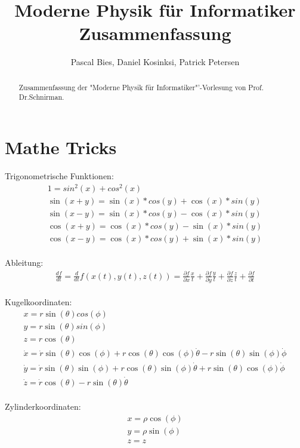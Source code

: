\documentclass[10pt,a4paper]{article}
\author{Pascal Bies, Daniel Kosinksi, Patrick Petersen}
\title{Moderne Physik für Informatiker Zusammenfassung}
\begin{document}
\maketitle

\begin{abstract}
Zusammenfassung der "Moderne Physik für Informatiker"'-Vorlesung von Prof. Dr.Schnirman.
\end{abstract}

\setcounter{tocdepth}{3}


\newpage
\tableofcontents


\newpage

\section{Mathe Tricks}

Trigonometrische Funktionen:
\begin{eqnarray}
1=sin^2(x)+cos^2(x)\\
\sin(x+y) = \sin(x)*cos(y) + \cos(x)*sin(y)\\
\sin(x-y) = \sin(x)*cos(y) - \cos(x)*sin(y)\\
\cos(x+y) = \cos(x)*cos(y) - \sin(x)*sin(y)\\
\cos(x-y) = \cos(x)*cos(y) + \sin(x)*sin(y)
\end{eqnarray}
%
\\
Ableitung:
\begin{eqnarray}
\frac{df}{dt} = \frac{d}{dt} f(x(t),y(t),z(t))=  \frac{\partial f}{\partial x} \frac{x}{t} + \frac{\partial f}{\partial y} \frac{y}{t} + \frac{\partial f}{\partial z} \frac{z}{t} + \frac{\partial f}{\partial t}
\end{eqnarray}
%
\\
Kugelkoordinaten:
\begin{eqnarray}
x = r \sin(\theta)cos(\phi)\\
y = r \sin(\theta)sin(\phi)\\
z = r \cos(\theta)\\
\dot{x} =\dot{r}\sin(\theta)\cos(\phi)+r\cos(\theta)\cos(\phi)\dot{\theta }-r\sin(\theta)\sin(\phi)\dot{\phi}\\
\dot{y} = \dot{r}\sin(\theta)\sin(\phi)+r\cos(\theta)\sin(\phi)\dot{\theta }+r\sin(\theta)\cos(\phi)\dot{\phi}\\
\dot{z}= \dot{r}\cos(\theta)-r\sin(\theta)\dot{\theta}
\end{eqnarray}
%
\\
Zylinderkoordinaten:
\begin{eqnarray}
x = \rho \cos(\phi)\\
y = \rho \sin(\phi)\\
z = z
\end{eqnarray}
\end{document}
